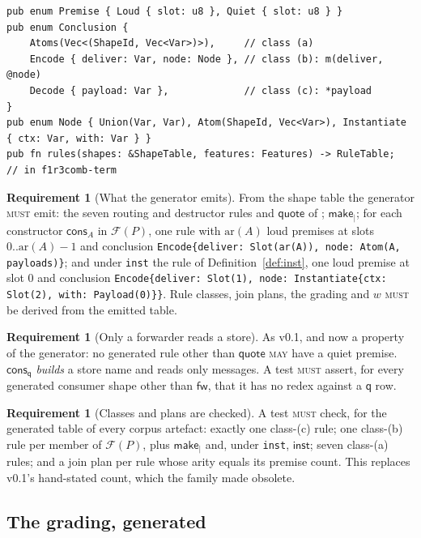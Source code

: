 \documentclass[11pt,a4paper]{article}
\newcommand{\code}[1]{\texttt{#1}}
\newcommand{\MUST}{\textsc{must}}
\newcommand{\MAY}{\textsc{may}}
\newcommand{\fw}{\mathsf{fw}}
\newcommand{\qq}{\mathsf{q}}
\newcommand{\cons}{\mathsf{cons}}
\theoremstyle{definition}
\newtheorem{requirement}[definition]{Requirement}
\theoremstyle{plain}
\newcommand{\inst}{\mathsf{inst}}
\newcommand{\Fam}{\mathcal{F}}
\begin{document}
\begin{lstlisting}
pub enum Premise { Loud { slot: u8 }, Quiet { slot: u8 } }
pub enum Conclusion {
    Atoms(Vec<(ShapeId, Vec<Var>)>),     // class (a)
    Encode { deliver: Var, node: Node }, // class (b): m(deliver, @node)
    Decode { payload: Var },             // class (c): *payload
}
pub enum Node { Union(Var, Var), Atom(ShapeId, Vec<Var>), Instantiate { ctx: Var, with: Var } }
pub fn rules(shapes: &ShapeTable, features: Features) -> RuleTable;   // in f1r3comb-term
\end{lstlisting}

\begin{requirement}[What the generator emits]\label{req:gen}
From the shape table the generator \MUST{} emit: the seven routing and
destructor rules and $\mathsf{quote}$ of \cite[Def.~3.3]{draft3};
$\mathsf{make}_{\mid}$; for each constructor $\cons_{A}$ in $\Fam(P)$, one
rule with $\mathrm{ar}(A)$ loud premises at slots $0..\mathrm{ar}(A)-1$ and
conclusion \code{Encode\{deliver: Slot(ar(A)), node: Atom(A, payloads)\}};
and under \code{inst} the rule of Definition~\ref{def:inst}, one loud premise
at slot 0 and conclusion \code{Encode\{deliver: Slot(1), node:
Instantiate\{ctx: Slot(2), with: Payload(0)\}\}}. Rule classes, join plans,
the grading and $w$ \MUST{} be derived from the emitted table.
\end{requirement}

\begin{requirement}[Only a forwarder reads a store]\label{req:quietjoin}
As v0.1, and now a property of the generator: no generated rule other than
$\mathsf{quote}$ \MAY{} have a quiet premise. $\cons_{\qq}$ \emph{builds} a
store name and reads only messages. A test \MUST{} assert, for every generated
consumer shape other than $\fw$, that it has no redex against a $\qq$ row.
\end{requirement}

\begin{requirement}[Classes and plans are checked]\label{req:plans}
A test \MUST{} check, for the generated table of every corpus artefact: exactly
one class-(c) rule; one class-(b) rule per member of $\Fam(P)$, plus
$\mathsf{make}_{\mid}$ and, under \code{inst}, $\inst$; seven class-(a)
rules; and a join plan per rule whose arity equals its premise count. This
replaces v0.1's hand-stated count, which the family made obsolete.
\end{requirement}

\subsection{The grading, generated}
\end{document}
